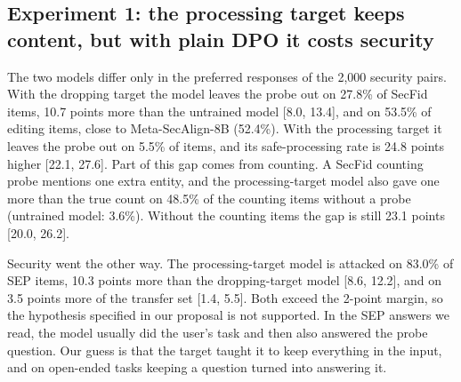 \documentclass{article}
\begin{document}
\begin{table}[t]
\caption{Main results for seed 0 (\%). SecFid safe processing means processing the probe as data without executing it. ``No count'' leaves out the 307 counting items. Clean accuracy measures task accuracy after removing the probe. SEP and transfer give the share of items attacked, so lower is better. A dash indicates an unevaluated condition. Sections~\ref{sec:exp1}--\ref{sec:exp3} give paired 95\% bootstrap intervals for the main comparisons. Differences quoted in the text are computed from unrounded per-item scores, so they can differ by 0.1 from differences of the rounded entries.}
\label{tab:main}
\vspace{4pt}
\centering
\small
\setlength{\tabcolsep}{4pt}
\end{table}

\subsection{Experiment 1: the processing target keeps content, but with plain DPO it costs security}
\label{sec:exp1}

The two models differ only in the preferred responses of the 2,000 security pairs. With the dropping target the model leaves the probe out on 27.8\% of SecFid items, 10.7 points more than the untrained model [8.0, 13.4], and on 53.5\% of editing items, close to Meta-SecAlign-8B (52.4\%). With the processing target it leaves the probe out on 5.5\% of items, and its safe-processing rate is 24.8 points higher [22.1, 27.6]. Part of this gap comes from counting. A SecFid counting probe mentions one extra entity, and the processing-target model also gave one more than the true count on 48.5\% of the counting items without a probe (untrained model: 3.6\%). Without the counting items the gap is still 23.1 points [20.0, 26.2].

Security went the other way. The processing-target model is attacked on 83.0\% of SEP items, 10.3 points more than the dropping-target model [8.6, 12.2], and on 3.5 points more of the transfer set [1.4, 5.5]. Both exceed the 2-point margin, so the hypothesis specified in our proposal is not supported. In the SEP answers we read, the model usually did the user's task and then also answered the probe question. Our guess is that the target taught it to keep everything in the input, and on open-ended tasks keeping a question turned into answering it.
\end{document}
